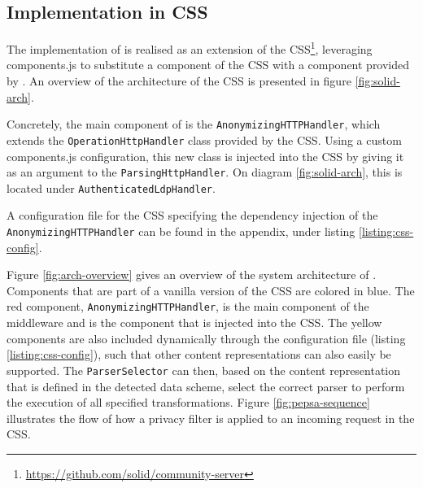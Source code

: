 

\subsection{Implementation in CSS}
The implementation of \middleware{} is realised as an extension of the \acrlong{CSS}\footnote{\url{https://github.com/solid/community-server}}, leveraging components.js to substitute a component of the \gls{CSS} with a component provided by \middleware{}. An overview of the architecture of the \gls{CSS} is presented in figure \ref{fig:solid-arch}.

Concretely, the main component of \middleware{} is the \texttt{AnonymizingHTTPHandler}, which extends the \texttt{OperationHttpHandler} class provided by the \gls{CSS}. Using a custom components.js configuration, this new class is injected into the \gls{CSS} by giving it as an argument to the \texttt{ParsingHttpHandler}. On diagram \ref{fig:solid-arch}, this is located under \texttt{AuthenticatedLdpHandler}.

A configuration file for the \gls{CSS} specifying the dependency injection of the \texttt{AnonymizingHTTPHandler} can be found in the appendix, under listing \ref{listing:css-config}.

Figure \ref{fig:arch-overview} gives an overview of the system architecture of \middleware{}. Components that are part of a vanilla version of the \gls{CSS} are colored in blue. The red component, \texttt{AnonymizingHTTPHandler}, is the main component of the middleware and is the component that is injected into the \gls{CSS}. The yellow components are also included dynamically through the configuration file (listing \ref{listing:css-config}), such that other content representations can also easily be supported. The \texttt{ParserSelector} can then, based on the content representation that is defined in the detected data scheme, select the correct parser to perform the execution of all specified transformations. 
Figure \ref{fig:pepsa-sequence} illustrates the flow of how a privacy filter is applied to an incoming request in the \gls{CSS}.

